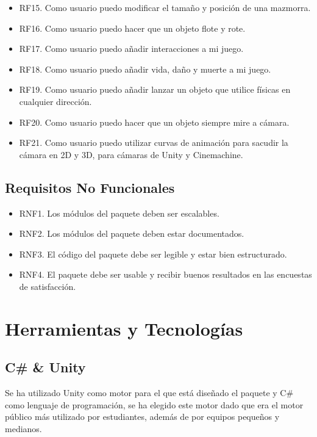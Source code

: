 \begin{itemize}
    \item RF15. Como usuario puedo modificar el tamaño y posición de una mazmorra.
    \item RF16. Como usuario puedo hacer que un objeto flote y rote.
    \item RF17. Como usuario puedo añadir interacciones a mi juego.
    \item RF18. Como usuario puedo añadir vida, daño y muerte a mi juego.
    \item RF19. Como usuario puedo añadir lanzar un objeto que utilice físicas en cualquier dirección.
    \item RF20. Como usuario puedo hacer que un objeto siempre mire a cámara.
    \item RF21. Como usuario puedo utilizar curvas de animación para sacudir la cámara en 2D y 3D, para cámaras de Unity y Cinemachine.
\end{itemize}

\subsection{Requisitos No Funcionales}

\begin{itemize}
    \item RNF1. Los módulos del paquete deben ser escalables.
    \item RNF2. Los módulos del paquete deben estar documentados.
    \item RNF3. El código del paquete debe ser legible y estar bien estructurado.
    \item RNF4. El paquete debe ser usable y recibir buenos resultados en las encuestas de satisfacción.
\end{itemize}

\section{Herramientas y Tecnologías}

\subsection{C\# \& Unity}

Se ha utilizado Unity\cite{unity} como motor para el que está diseñado el paquete y C\#\cite{csharp} como lenguaje de programación, se ha elegido este motor dado que era el motor público más utilizado por estudiantes, además de por equipos pequeños y medianos.


